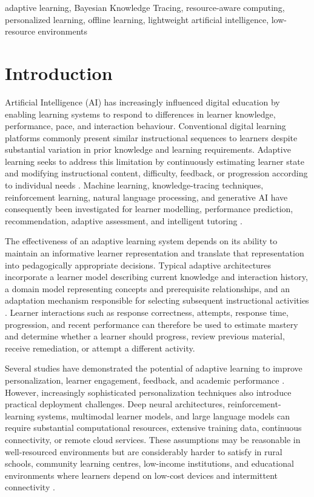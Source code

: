 \documentclass[conference]{IEEEtran}
\begin{document}
\begin{IEEEkeywords}
adaptive learning, Bayesian Knowledge Tracing, resource-aware computing, personalized learning, offline learning, lightweight artificial intelligence, low-resource environments
\end{IEEEkeywords}

\section{Introduction}

Artificial Intelligence (AI) has increasingly influenced digital education by enabling learning systems to respond to differences in learner knowledge, performance, pace, and interaction behaviour. Conventional digital learning platforms commonly present similar instructional sequences to learners despite substantial variation in prior knowledge and learning requirements. Adaptive learning seeks to address this limitation by continuously estimating learner state and modifying instructional content, difficulty, feedback, or progression according to individual needs \cite{mittal2024,tan2025}. Machine learning, knowledge-tracing techniques, reinforcement learning, natural language processing, and generative AI have consequently been investigated for learner modelling, performance prediction, recommendation, adaptive assessment, and intelligent tutoring \cite{hariyanto2025,ruan2025}.

The effectiveness of an adaptive learning system depends on its ability to maintain an informative learner representation and translate that representation into pedagogically appropriate decisions. Typical adaptive architectures incorporate a learner model describing current knowledge and interaction history, a domain model representing concepts and prerequisite relationships, and an adaptation mechanism responsible for selecting subsequent instructional activities \cite{tan2025,pelanek2024rules}. Learner interactions such as response correctness, attempts, response time, progression, and recent performance can therefore be used to estimate mastery and determine whether a learner should progress, review previous material, receive remediation, or attempt a different activity.

Several studies have demonstrated the potential of adaptive learning to improve personalization, learner engagement, feedback, and academic performance \cite{contrino2024,merino2025}. However, increasingly sophisticated personalization techniques also introduce practical deployment challenges. Deep neural architectures, reinforcement-learning systems, multimodal learner models, and large language models can require substantial computational resources, extensive training data, continuous connectivity, or remote cloud services. These assumptions may be reasonable in well-resourced environments but are considerably harder to satisfy in rural schools, community learning centres, low-income institutions, and educational environments where learners depend on low-cost devices and intermittent connectivity \cite{pelanek2025hard,amin2023}.
\end{document}
